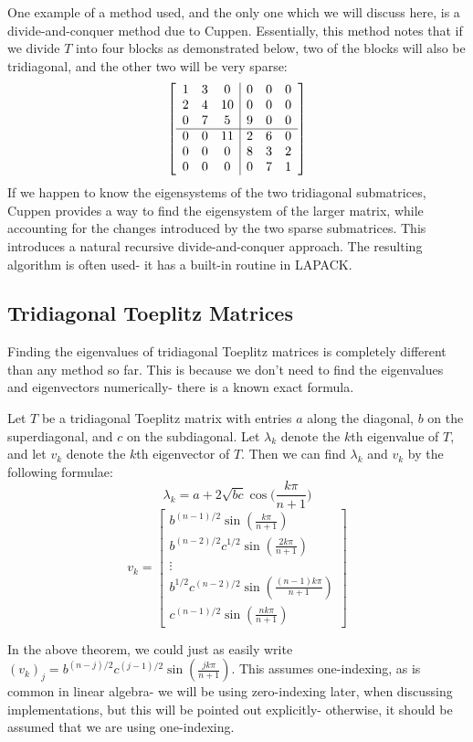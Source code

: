 \documentclass[10pt,twocolumn]{article}
\begin{document}
One example of a method used, and the only one which we will discuss here, is a divide-and-conquer method due to Cuppen\cite{Arbenz_2018}. Essentially, this method notes that if we divide $T$ into four blocks as demonstrated below, two of the blocks will also be tridiagonal, and the other two will be very sparse:
$$
\left[ 
\begin{array}{c c c|c c c} 
  1 & 3 & 0 & 0 & 0 & 0 \\ 
  2 & 4 & 10 & 0 & 0 & 0 \\
  0 & 7 & 5 & 9 & 0 & 0 \\
  \hline 
  0 & 0 & 11 & 2 & 6 & 0 \\
  0 & 0 & 0 & 8 & 3 & 2 \\
  0 & 0 & 0 & 0 & 7 & 1
\end{array} 
\right] 
$$
If we happen to know the eigensystems of the two tridiagonal submatrices, Cuppen provides a way to find the eigensystem of the larger matrix, while accounting for the changes introduced by the two sparse submatrices. This introduces a natural recursive divide-and-conquer approach. The resulting algorithm is often used- it has a built-in routine in LAPACK.\cite{SymmEig}

\subsection{Tridiagonal Toeplitz Matrices}

Finding the eigenvalues of tridiagonal Toeplitz matrices is completely different than any method so far. This is because we don't need to find the eigenvalues and eigenvectors numerically- there is a known exact formula.

\begin{thm}\label{tritoe}\cite{Bottcher_Grudsky_2005}
    Let $T$ be a tridiagonal Toeplitz matrix with entries $a$ along the diagonal, $b$ on the superdiagonal, and $c$ on the subdiagonal. Let $\lambda_k$ denote the $k$th eigenvalue of $T$, and let $v_k$ denote the $k$th eigenvector of $T$. Then we can find $\lambda_k$ and $v_k$ by the following formulae: $$\lambda_k=a+2\sqrt{bc}\cos \bigl( \frac{k\pi}{n+1} \bigl)$$
                        $$v_k=\begin{bmatrix}
b^{(n-1)/2}\sin(\frac{k\pi}{n+1}) \\
b^{(n-2)/2}c^{1/2}\sin(\frac{2k\pi}{n+1}) \\
\vdots \\
b^{1/2}c^{(n-2)/2}\sin(\frac{(n-1)k\pi}{n+1})\\
c^{(n-1)/2}\sin(\frac{nk\pi}{n+1})
\end{bmatrix}$$
\end{thm}
In the above theorem, we could just as easily write $(v_k)_j=b^{(n-j)/2}c^{(j-1)/2}\sin(\frac{jk\pi}{n+1})$. This assumes one-indexing, as is common in linear algebra- we will be using zero-indexing later, when discussing implementations, but this will be pointed out explicitly- otherwise, it should be assumed that we are using one-indexing.
\end{document}
